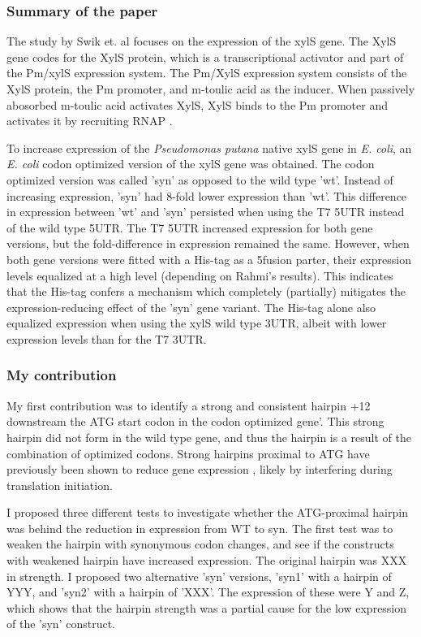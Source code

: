%

\subsubsection{Summary of the paper}
The study by Swik et. al focuses on the expression of the xylS gene. The XylS
gene codes for the XylS protein, which is a transcriptional activator and part
of the Pm/xylS expression system. The Pm/XylS expression system consists of the
XylS protein, the Pm promoter, and m-toulic acid as the inducer. When passively
abosorbed m-toulic acid activates XylS, XylS binds to the Pm promoter and
activates it by recruiting RNAP \cite{gallegos_arac/xyls_1997,
inouye_expression_1987}.

To increase expression of the \textit{Pseudomonas putana} native xylS gene in
\textit{E. coli}, an \textit{E. coli} codon optimized version of the xylS gene
was obtained. The codon optimized version was called 'syn' as opposed to the
wild type 'wt'. Instead of increasing expression, 'syn' had 8-fold lower
expression than 'wt'. This difference in expression between 'wt' and 'syn'
persisted when using the T7 5\p UTR instead of the wild type 5\p UTR. The T7
5\p UTR increased expression for both gene versions, but the fold-difference in
expression remained the same. However, when both gene versions were fitted with
a His-tag as a 5\p fusion parter, their expression levels equalized at a high
level (depending on Rahmi's results). This indicates that the His-tag confers a
mechanism which completely (partially) mitigates the expression-reducing effect
of the 'syn' gene variant. The His-tag alone also equalized expression when
using the xylS wild type 3\p UTR, albeit with lower expression levels than for
the T7 3\p UTR.

\subsubsection{My contribution}
My first contribution was to identify a strong and consistent hairpin +12
downstream the ATG start codon in the codon optimized gene'. This strong
hairpin did not form in the wild type gene, and thus the hairpin is a result of
the combination of optimized codons. Strong hairpins proximal to ATG have
previously been shown to reduce gene expression \cite{seo_quantitative_2009},
likely by interfering during translation initiation.

I proposed three different tests to investigate whether the ATG-proximal
hairpin was behind the reduction in expression from WT to syn. The first test
was to weaken the hairpin with synonymous codon changes, and see if the
constructs with weakened hairpin have increased expression. The original
hairpin was XXX in strength. I proposed two alternative 'syn' versions, 'syn1'
with a hairpin of YYY, and 'syn2' with a hairpin of 'XXX'. The expression of
these were Y and Z, which shows that the hairpin strength was a partial cause
for the low expression of the 'syn' construct.

